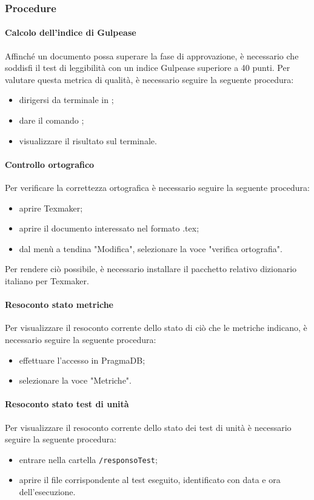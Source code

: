 \subsubsection{Procedure}
\paragraph{Calcolo dell'indice di Gulpease}
Affinché un documento possa superare la fase di approvazione, è necessario che soddisfi il test di leggibilità con un indice Gulpease superiore a 40 punti. Per valutare questa metrica di qualità, è necessario seguire la seguente procedura:
\begin{itemize}
	\item dirigersi da terminale in \GulScript{};
	\item dare il comando ;
	\item visualizzare il risultato sul terminale.
\end{itemize}
\paragraph{Controllo ortografico}
Per verificare la correttezza ortografica è necessario seguire la seguente procedura:
\begin{itemize}
	\item aprire Texmaker;
	\item aprire il documento interessato nel formato .tex;
	\item dal menù a tendina "Modifica", selezionare la voce "verifica ortografia".
\end{itemize}
Per rendere ciò possibile, è necessario installare il pacchetto relativo dizionario italiano per Texmaker.
\paragraph{Resoconto stato metriche}
Per visualizzare il resoconto corrente dello stato di ciò che le metriche indicano, è necessario seguire la seguente procedura:
\begin{itemize}
	\item effettuare l'accesso in PragmaDB;
	\item selezionare la voce "Metriche".
\end{itemize}
\paragraph{Resoconto stato test di unità}
Per visualizzare il resoconto corrente dello stato dei test di unità è necessario seguire la seguente procedura:
\begin{itemize}
	\item entrare nella cartella \texttt{/responsoTest};
	\item aprire il file corrispondente al test eseguito, identificato con data e ora dell'esecuzione.
\end{itemize}
